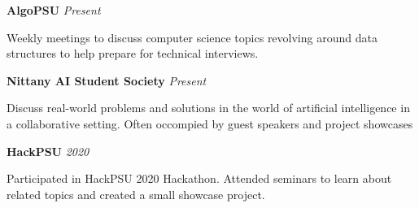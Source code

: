 \documentclass[fontsize=11pt]{article}
\newcommand{\sepspace}{\vspace*{.8em}}   %
\newcommand{\EducationEntry}[4]{
    \noindent \textbf{#1} \normal {#4} \hfill      %
    \colorbox{White}{
      \parbox{8.5em}{
      \hfill\color{Black}#2}} \par  %
    \noindent \textit{#3} \par        %
    \normalsize \par}
\newcommand{\AwardEntry}[4]{         %
    \noindent \textbf{#1} \noindent \textit{#3} \hfill {#2} \par
    \noindent \small #4 %
    \normalsize \par}
\begin{document}
\AwardEntry{AlgoPSU}{}
{Present}
{Weekly meetings to discuss computer science topics revolving around data structures to help prepare for technical interviews.}
\sepspace
\AwardEntry{Nittany AI Student Society}{}
{Present}
{Discuss real-world problems and solutions in the world of artificial intelligence in a collaborative setting. Often occompied by guest speakers and project showcases}
\sepspace
\AwardEntry{HackPSU}{}
{2020}
{Participated in HackPSU 2020 Hackathon. Attended seminars to learn about related topics and created a small showcase project.}
\
\end{document}
